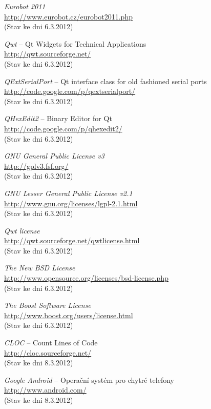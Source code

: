 \documentclass[12pt, a4paper, oneside]{article}
\newcommand{\It}{\textit}  %
\begin{document}
\begin{thebibliography}{99}
     \It{Eurobot 2011} \\
    \url{http://www.eurobot.cz/eurobot2011.php}\\
    (Stav ke dni 6.3.2012)

     \It{Qwt} -- Qt Widgets for Technical Applications \\
    \url{http://qwt.sourceforge.net/}\\
    (Stav ke dni 6.3.2012)

     \It{QExtSerialPort} -- Qt interface class for old fashioned serial ports \\
    \url{http://code.google.com/p/qextserialport/}\\
    (Stav ke dni 6.3.2012)

     \It{QHexEdit2} -- Binary Editor for Qt \\
    \url{http://code.google.com/p/qhexedit2/}\\
    (Stav ke dni 6.3.2012)

     \It{GNU General Public License v3} \\
    \url{http://gplv3.fsf.org/}\\
    (Stav ke dni 6.3.2012)

     \It{GNU Lesser General Public License v2.1} \\
    \url{http://www.gnu.org/licenses/lgpl-2.1.html}\\
    (Stav ke dni 6.3.2012)

     \It{Qwt license} \\
    \url{http://qwt.sourceforge.net/qwtlicense.html}\\
    (Stav ke dni 6.3.2012)

     \It{The New BSD License} \\
    \url{http://www.opensource.org/licenses/bsd-license.php}\\
    (Stav ke dni 6.3.2012)

     \It{The Boost Software License} \\
    \url{http://www.boost.org/users/license.html}\\
    (Stav ke dni 6.3.2012)

     \It{CLOC} -- Count Lines of Code \\
    \url{http://cloc.sourceforge.net/}\\
    (Stav ke dni 8.3.2012)

     \It{Google Android} -- Operační systém pro chytré telefony\\
    \url{http://www.android.com/}\\
    (Stav ke dni 8.3.2012)

\end{thebibliography}

\newpage
{} %

\listoffigures   %
\end{document}

